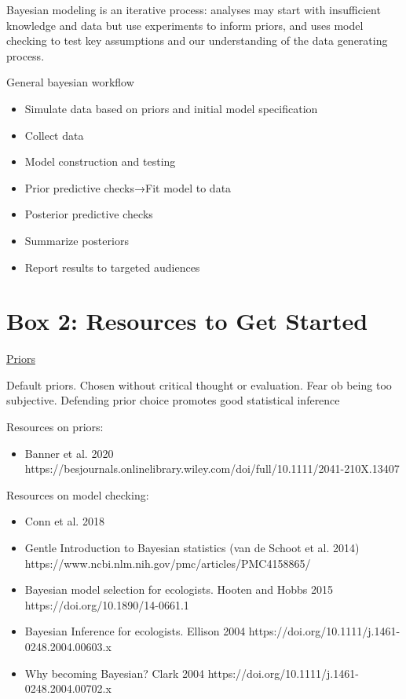 \documentclass{article}
\begin{document}
\par Bayesian modeling is an iterative process: analyses may start with insufficient knowledge and data but use experiments to inform priors, and uses model checking to test key assumptions and our understanding of the data generating process.
\par General bayesian workflow 
\begin{itemize}
\item Simulate data based on priors and initial model specification 
\item Collect data
\item Model construction and testing
\item Prior predictive checks→Fit model to data
\item Posterior predictive checks
\item Summarize posteriors
\item Report results to targeted audiences
\end{itemize}



\section* {Box 2: Resources to Get Started}
\underline{Priors}
\par Default priors. Chosen without critical thought or evaluation. Fear ob being too subjective. Defending prior choice promotes good statistical inference
\par Resources on priors: 

\begin{itemize}
\item Banner et al. 2020 https://besjournals.onlinelibrary.wiley.com/doi/full/10.1111/2041-210X.13407 
\end{itemize}

\par Resources on model checking:
\begin{itemize}
\item Conn et al. 2018 %
\item Gentle Introduction to Bayesian statistics (van de Schoot et al. 2014)
https://www.ncbi.nlm.nih.gov/pmc/articles/PMC4158865/
\item Bayesian model selection for ecologists. Hooten and Hobbs 2015
 https://doi.org/10.1890/14-0661.1
\item Bayesian Inference for ecologists. Ellison 2004
 https://doi.org/10.1111/j.1461-0248.2004.00603.x
\item Why becoming Bayesian? Clark 2004
 https://doi.org/10.1111/j.1461-0248.2004.00702.x

\end{itemize}
 
\end{document}
